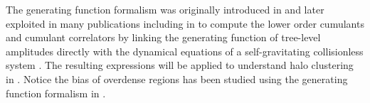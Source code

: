 The generating function formalism was  originally introduced in \citep{BaS89} and later
exploited in many publications including in \citep{Ber92,Ber94} to compute the lower order cumulants and cumulant correlators \citep{francis}
by linking the generating function of tree-level amplitudes directly with the dynamical
equations of a self-gravitating collisionless system \citep{review}. 
The resulting expressions will be applied to understand halo clustering in \textsection{\ref{sec:non}}.
Notice the bias of overdense regions has been studied using
the generating function formalism in  \citep{francis}.
%
